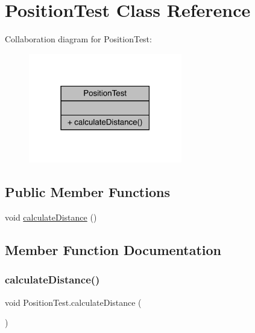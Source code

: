 \hypertarget{class_position_test}{}\section{Position\+Test Class Reference}
\label{class_position_test}


Collaboration diagram for Position\+Test\+:
\nopagebreak
\begin{figure}[H]
\begin{center}
\leavevmode
\includegraphics[width=190pt]{class_position_test__coll__graph}
\end{center}
\end{figure}
\subsection*{Public Member Functions}
\begin{DoxyCompactItemize}
\item 
void \mbox{\hyperlink{class_position_test_ac8109a5d9da5c243e9c2b513404271f7}{calculate\+Distance}} ()
\end{DoxyCompactItemize}


\subsection{Member Function Documentation}
\mbox{\label{class_position_test_ac8109a5d9da5c243e9c2b513404271f7}} 
\subsubsection{\texorpdfstring{calculate\+Distance()}{calculateDistance()}}
{\footnotesize\ttfamily void Position\+Test.\+calculate\+Distance (\begin{DoxyParamCaption}{ }\end{DoxyParamCaption})\hspace{0.3cm}{\ttfamily [inline]}}

